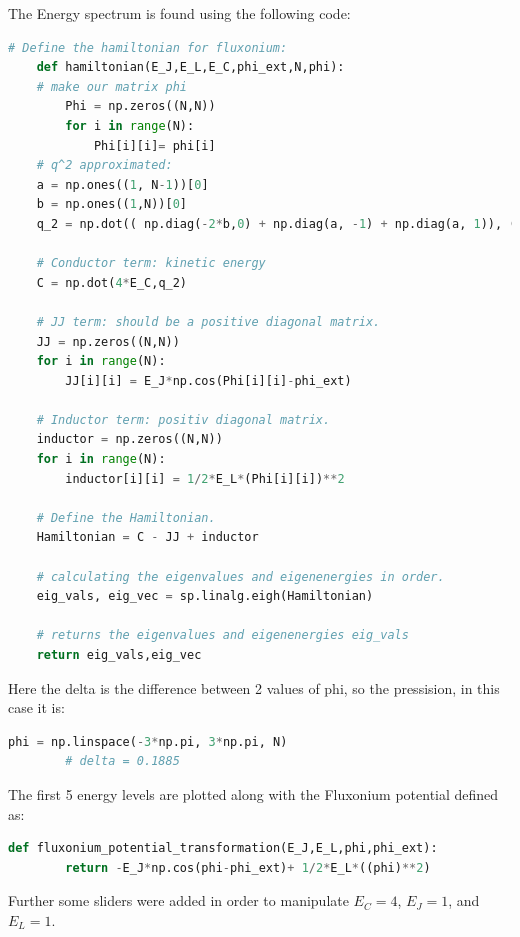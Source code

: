     The Energy spectrum is found using the following code: 
    \begin{lstlisting}[language =Python, caption=Python example]
# Define the hamiltonian for fluxonium:
    def hamiltonian(E_J,E_L,E_C,phi_ext,N,phi):
    # make our matrix phi
        Phi = np.zeros((N,N))
        for i in range(N):
            Phi[i][i]= phi[i]
    # q^2 approximated: 
    a = np.ones((1, N-1))[0]
    b = np.ones((1,N))[0]
    q_2 = np.dot(( np.diag(-2*b,0) + np.diag(a, -1) + np.diag(a, 1)), (-(1))/(delta**2))

    # Conductor term: kinetic energy
    C = np.dot(4*E_C,q_2)
    
    # JJ term: should be a positive diagonal matrix. 
    JJ = np.zeros((N,N))
    for i in range(N):
        JJ[i][i] = E_J*np.cos(Phi[i][i]-phi_ext)

    # Inductor term: positiv diagonal matrix.
    inductor = np.zeros((N,N))
    for i in range(N):
        inductor[i][i] = 1/2*E_L*(Phi[i][i])**2

    # Define the Hamiltonian.
    Hamiltonian = C - JJ + inductor
    
    # calculating the eigenvalues and eigenenergies in order.
    eig_vals, eig_vec = sp.linalg.eigh(Hamiltonian)  
    
    # returns the eigenvalues and eigenenergies eig_vals
    return eig_vals,eig_vec
    \end{lstlisting}
    Here the delta is the difference between 2 values of phi, so the pressision, in this case it is: 
    \begin{lstlisting}[language = Python]
        phi = np.linspace(-3*np.pi, 3*np.pi, N)
        # delta = 0.1885
    \end{lstlisting}
    The first 5 energy levels are plotted along with the Fluxonium potential defined as: 
    \begin{lstlisting}[language=Python]
    def fluxonium_potential_transformation(E_J,E_L,phi,phi_ext):
        return -E_J*np.cos(phi-phi_ext)+ 1/2*E_L*((phi)**2)
    \end{lstlisting} 
    Further some sliders were added in order to manipulate $E_C = 4$, $E_J = 1$, and $E_L = 1$. 
\newpage

